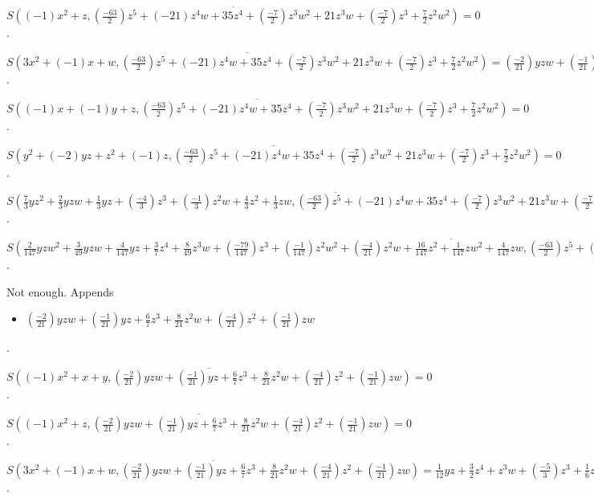 \documentclass{jsarticle}
\begin{document}
$\overline{S((-1)x^{2}+z, (\frac{-63}{2})z^{5}+(-21)z^{4}w+35z^{4}+(\frac{-7}{2})z^{3}w^{2}+21z^{3}w+(\frac{-7}{2})z^{3}+\frac{7}{2}z^{2}w^{2})} = 0$.  

$\overline{S(3x^{2}+(-1)x+w, (\frac{-63}{2})z^{5}+(-21)z^{4}w+35z^{4}+(\frac{-7}{2})z^{3}w^{2}+21z^{3}w+(\frac{-7}{2})z^{3}+\frac{7}{2}z^{2}w^{2})} = (\frac{-2}{21})yzw+(\frac{-1}{21})yz+\frac{6}{7}z^{3}+\frac{8}{21}z^{2}w+(\frac{-4}{21})z^{2}+(\frac{-1}{21})zw$.  

$\overline{S((-1)x+(-1)y+z, (\frac{-63}{2})z^{5}+(-21)z^{4}w+35z^{4}+(\frac{-7}{2})z^{3}w^{2}+21z^{3}w+(\frac{-7}{2})z^{3}+\frac{7}{2}z^{2}w^{2})} = 0$.  

$\overline{S(y^{2}+(-2)yz+z^{2}+(-1)z, (\frac{-63}{2})z^{5}+(-21)z^{4}w+35z^{4}+(\frac{-7}{2})z^{3}w^{2}+21z^{3}w+(\frac{-7}{2})z^{3}+\frac{7}{2}z^{2}w^{2})} = 0$.  

$\overline{S(\frac{7}{3}yz^{2}+\frac{2}{3}yzw+\frac{1}{3}yz+(\frac{-4}{3})z^{3}+(\frac{-1}{3})z^{2}w+\frac{4}{3}z^{2}+\frac{1}{3}zw, (\frac{-63}{2})z^{5}+(-21)z^{4}w+35z^{4}+(\frac{-7}{2})z^{3}w^{2}+21z^{3}w+(\frac{-7}{2})z^{3}+\frac{7}{2}z^{2}w^{2})} = 0$.  

$\overline{S(\frac{2}{147}yzw^{2}+\frac{3}{49}yzw+\frac{4}{147}yz+\frac{3}{7}z^{4}+\frac{8}{49}z^{3}w+(\frac{-79}{147})z^{3}+(\frac{-1}{147})z^{2}w^{2}+(\frac{-4}{21})z^{2}w+\frac{16}{147}z^{2}+\frac{1}{147}zw^{2}+\frac{4}{147}zw, (\frac{-63}{2})z^{5}+(-21)z^{4}w+35z^{4}+(\frac{-7}{2})z^{3}w^{2}+21z^{3}w+(\frac{-7}{2})z^{3}+\frac{7}{2}z^{2}w^{2})} = 0$.  

Not enough.  Appends \begin{itemize}
\item $(\frac{-2}{21})yzw+(\frac{-1}{21})yz+\frac{6}{7}z^{3}+\frac{8}{21}z^{2}w+(\frac{-4}{21})z^{2}+(\frac{-1}{21})zw$
\end{itemize}  . 


$\overline{S((-1)x^{2}+x+y, (\frac{-2}{21})yzw+(\frac{-1}{21})yz+\frac{6}{7}z^{3}+\frac{8}{21}z^{2}w+(\frac{-4}{21})z^{2}+(\frac{-1}{21})zw)} = 0$.  

$\overline{S((-1)x^{2}+z, (\frac{-2}{21})yzw+(\frac{-1}{21})yz+\frac{6}{7}z^{3}+\frac{8}{21}z^{2}w+(\frac{-4}{21})z^{2}+(\frac{-1}{21})zw)} = 0$.  

$\overline{S(3x^{2}+(-1)x+w, (\frac{-2}{21})yzw+(\frac{-1}{21})yz+\frac{6}{7}z^{3}+\frac{8}{21}z^{2}w+(\frac{-4}{21})z^{2}+(\frac{-1}{21})zw)} = \frac{1}{12}yz+\frac{3}{2}z^{4}+z^{3}w+(\frac{-5}{3})z^{3}+\frac{1}{6}z^{2}w^{2}+(-1)z^{2}w+\frac{1}{3}z^{2}+(\frac{-1}{6})zw^{2}+\frac{1}{12}zw$.  
\end{document}
